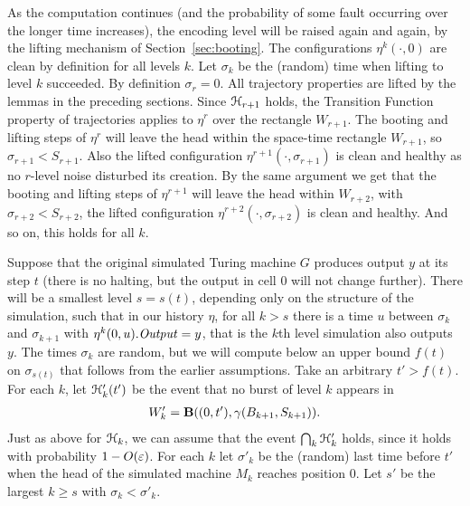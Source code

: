 \documentclass[11pt]{memoir}
\theoremstyle{definition} %
\renewcommand{\ge}{\geq}
\newcommand{\fld}[1]{\ensuremath{\textit{#1\/}}}
\def\B{B}
\def\G{G} %
\renewcommand{\S}{S} %
\newcommand{\Output}{\fld{Output}}
\begin{document}
As the computation continues (and the probability of some fault occurring
over the longer time increases),
the encoding level will be raised again and again, by the lifting
mechanism of Section~\ref{sec:booting}.
The configurations \( \eta^{k}(\cdot,0) \) are clean by definition for all levels \( k \).
Let \( \sigma_{k} \) be the (random) time when lifting to level \( k \) succeeded.
By definition \( \sigma_{r}=0 \).
All trajectory properties are lifted by the lemmas in the preceding sections.
Since \( \mathcal{H}_{r+1} \) holds, the Transition Function property of trajectories
applies to \( \eta^{r} \) over the rectangle \( W_{r+1} \).
The booting and lifting steps of \( \eta^{r} \) will leave the head within the
space-time rectangle \( W_{r+1} \), so \( \sigma_{r+1}<\S_{r+1} \).
Also the lifted configuration \( \eta^{r+1}(\cdot,\sigma_{r+1}) \) is
clean and healthy as no \( r \)-level noise disturbed its creation.
By the same argument we get that the booting and lifting steps of \( \eta^{r+1} \)
will leave the head within \( W_{r+2} \), with \( \sigma_{r+2}<\S_{r+2} \),
the lifted configuration \( \eta^{r+2}(\cdot,\sigma_{r+2}) \) is clean and healthy.
And so on, this holds for all \( k \).

Suppose that the original simulated Turing machine \( \G \)
produces output \( y \) at its step \( t \) (there is no halting,
but the output in cell 0 will not change further).
There will be a smallest level \( s = s(t) \), depending only on the structure of the simulation,
such that in our history \( \eta \), for all \( k>s \) there is a time \( u \) between
\( \sigma_{k} \) and \( \sigma_{k+1} \) with \( \eta^{k}(0,u).\Output = y \),
that is the \( k \)th level simulation also outputs \( y \).
The times \( \sigma_{k} \) are random, but we will compute below an upper
bound \( f(t) \) on \( \sigma_{s(t)} \) that follows from the earlier assumptions.
Take an arbitrary \( t'>f(t) \).
For each \( k \), let
\( \mathcal{H}'_{k}(t') \) be the event that no burst of level \( k \) appears in
\begin{align*}
 W'_{k} = \bB(\pair{0}{t'},\gamma\pair{\B_{k+1}}{\S_{k+1}}) .
\end{align*}
Just as above for \( \mathcal{H}_{k} \), we can
assume that the event \( \bigcap_{k}\mathcal{H}'_{k} \) holds, since it holds
with probability \( 1-O(\varepsilon) \).
For each \( k \) let \( \sigma'_{k} \) be the (random) last time before \( t' \)
when the head of the simulated machine \( M_{k} \) reaches position 0.
Let \( s' \) be the largest \( k\ge s \) with \( \sigma_{k}<\sigma'_{k} \).
\end{document}
